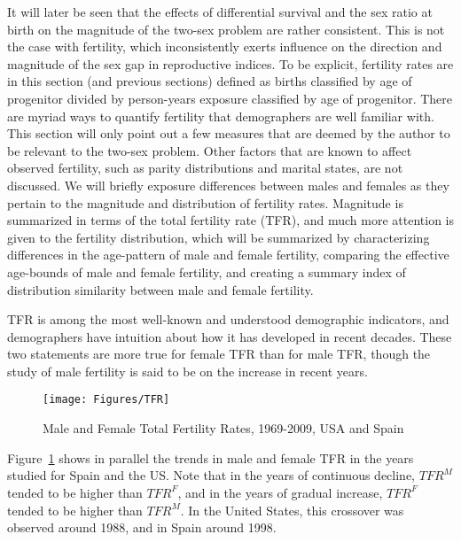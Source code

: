  \FloatBarrier
 \label{sec:dimorphASFR}
 
It will later be seen that the effects of differential survival and the
sex ratio at birth on the magnitude of the two-sex problem are rather
consistent. This is not the case with fertility, which inconsistently exerts
influence on the direction and magnitude of the sex gap in reproductive indices.
To be explicit, fertility rates are in this section (and previous sections) defined 
as births classified by age of progenitor divided by person-years exposure classified by age of progenitor.
There are myriad ways to quantify fertility that demographers are well familiar
with. This section will only point out a few measures that are deemed by the
author to be relevant to the two-sex problem. Other factors that are known to
affect observed fertility, such as parity distributions and marital states, are
not discussed. We will briefly exposure differences between males and females as
they pertain to the magnitude and distribution of fertility rates. Magnitude is summarized in
terms of the total fertility rate (TFR), and much more attention is given to the
fertility distribution, which will be summarized by characterizing differences
in the age-pattern of male and female fertility, comparing the effective
age-bounds of male and female fertility, and creating a summary index of
distribution similarity between male and female fertility.

TFR is among the most well-known and understood demographic indicators, and
demographers have intuition about how it has developed in recent decades. These
two statements are more true for female TFR than for male TFR, though the study
of male fertility is said to be on the increase in recent years.

\begin{figure}[ht!]
        \centering  
          \caption{Male and Female Total Fertility Rates, 1969-2009, USA and
          Spain}
           \texttt{[image: Figures/TFR]}
          \label{fig:TFRseries}
\end{figure}

Figure~\ref{fig:TFRseries} shows in parallel the trends in male and female TFR
in the years studied for Spain and the US. Note that
in the years of continuous decline, $TFR^M$ tended to be higher than $TFR^F$,
and in the years of gradual increase, $TFR^F$ tended to be higher than $TFR^M$. In the United States,
this crossover was observed around 1988, and in Spain around 1998. 

